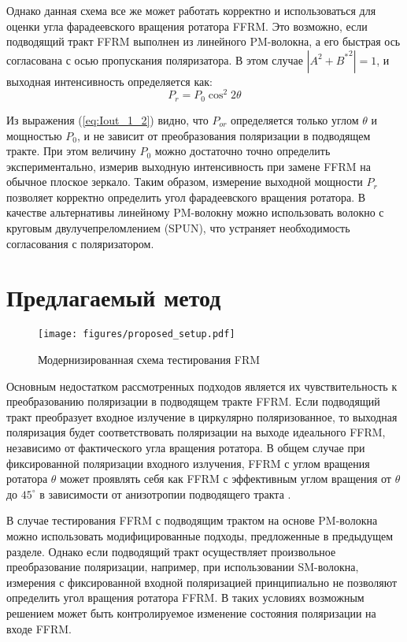 \documentclass{article}
\begin{document}
Однако данная схема все же может работать корректно и использоваться для оценки  угла фарадеевского вращения ротатора FFRM. Это возможно, если подводящий тракт FFRM выполнен из линейного PM-волокна, а его быстрая ось согласована с осью пропускания поляризатора.  В этом случае $\left| A^2 + {B^*}^2 \right| = 1$, и выходная интенсивность определяется как: 
\begin{equation}
	\label{eq:Iout_1_2}
	P_{r} =  P_0 \cos^2 2 \theta 
\end{equation}

Из выражения (\ref{eq:Iout_1_2}) видно, что $P_{or}$ определяется только углом  $\theta$ и мощностью $P_0$, и не зависит от преобразования поляризации в подводящем тракте. При этом величину $P_0$ можно достаточно точно определить экспериментально, измерив выходную интенсивность при замене FFRM на обычное плоское зеркало. Таким образом, измерение выходной мощности $P_{r}$ позволяет корректно определить угол фарадеевского вращения ротатора. В качестве альтернативы линейному PM-волокну можно использовать волокно с круговым двулучепреломлением (SPUN), что устраняет необходимость согласования с поляризатором. 


\section{Предлагаемый метод}
\begin{figure}[b]
	\centering
	\texttt{[image: figures/proposed\_setup.pdf]}
	\caption{Модернизированная схема тестирования FRM}
	\label{fig:proposed_setup}
\end{figure} 
Основным недостатком рассмотренных подходов является их чувствительность к преобразованию поляризации в подводящем тракте FFRM.  Если подводящий тракт преобразует входное излучение в циркулярно поляризованное, то  выходная поляризация будет соответствовать поляризации на выходе идеального FFRM, независимо от фактического угла вращения ротатора. В общем случае при фиксированной поляризации входного излучения, FFRM с углом вращения ротатора $\theta$ может проявлять себя как FFRM с эффективным углом вращения от $\theta$ до $45^\circ$ в зависимости от анизотропии подводящего тракта \autocite{buchilkoAnalysisStatePolarization2024}.

В случае тестирования FFRM с подводящим трактом на основе PM-волокна можно использовать модифицированные подходы, предложенные в предыдущем разделе. Однако если подводящий тракт осуществляет произвольное преобразование поляризации, например, при использовании SM-волокна, измерения с фиксированной входной поляризацией принципиально не позволяют определить угол вращения ротатора FFRM. В таких условиях возможным решением может быть контролируемое изменение состояния поляризации на входе FFRM.
\end{document}
